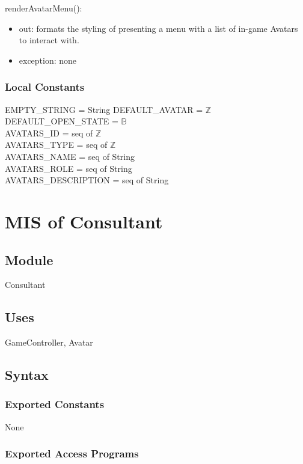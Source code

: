 \documentclass[12pt, titlepage]{article}
\begin{document}
\noindent renderAvatarMenu():
\begin{itemize}
\item out: formats the styling of presenting a menu with a list of in-game Avatars to interact with.
\item exception: none
\end{itemize}

\subsubsection{Local Constants}
EMPTY\_STRING = String
DEFAULT\_AVATAR = $\mathbb{Z}$\\
DEFAULT\_OPEN\_STATE = $\mathbb{B}$\\
AVATARS\_ID = seq of $\mathbb{Z}$\\
AVATARS\_TYPE = seq of $\mathbb{Z}$\\
AVATARS\_NAME = seq of  String\\
AVATARS\_ROLE = seq of String\\
AVATARS\_DESCRIPTION = seq of String\\

\newpage


\section{MIS of Consultant} 


\subsection{Module}
Consultant

\subsection{Uses}
GameController, Avatar


\subsection{Syntax}

\subsubsection{Exported Constants}
None

\subsubsection{Exported Access Programs}
\end{document}
